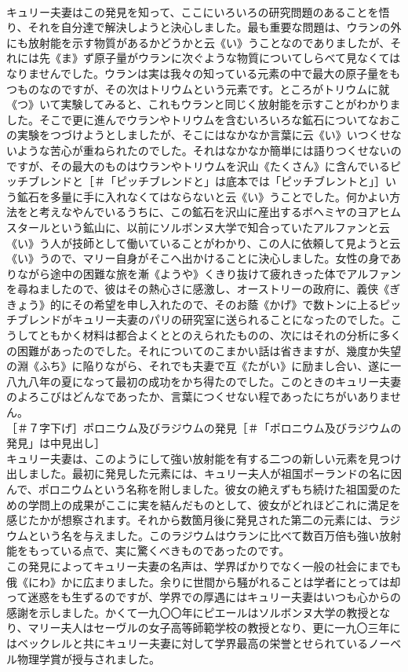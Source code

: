 \documentclass[8pt]{extreport}
\begin{document}
\begin{CJK}{UTF8}{min}
\\	キュリー夫妻はこの発見を知って、ここにいろいろの研究問題のあることを悟り、それを自分達で解決しようと決心しました。最も重要な問題は、ウランの外にも放射能を示す物質があるかどうかと云《い》うことなのでありましたが、それには先《ま》ず原子量がウランに次ぐような物質についてしらべて見なくてはなりませんでした。ウランは実は我々の知っている元素の中で最大の原子量をもつものなのですが、その次はトリウムという元素です。ところがトリウムに就《つ》いて実験してみると、これもウランと同じく放射能を示すことがわかりました。そこで更に進んでウランやトリウムを含むいろいろな鉱石についてなおこの実験をつづけようとしましたが、そこにはなかなか言葉に云《い》いつくせないような苦心が重ねられたのでした。それはなかなか簡単には語りつくせないのですが、その最大のものはウランやトリウムを沢山《たくさん》に含んでいるピッチブレンドと［＃「ピッチブレンドと」は底本では「ピッチブレントと」］いう鉱石を多量に手に入れなくてはならないと云《い》うことでした。何かよい方法をと考えなやんでいるうちに、この鉱石を沢山に産出するボヘミヤのヨアヒムスタールという鉱山に、以前にソルボンヌ大学で知合っていたアルファンと云《い》う人が技師として働いていることがわかり、この人に依頼して見ようと云《い》うので、マリー自身がそこへ出かけることに決心しました。女性の身でありながら途中の困難な旅を漸《ようや》くきり抜けて疲れきった体でアルファンを尋ねましたので、彼はその熱心さに感激し、オーストリーの政府に、義侠《ぎきょう》的にその希望を申し入れたので、そのお蔭《かげ》で数トンに上るピッチブレンドがキュリー夫妻のパリの研究室に送られることになったのでした。こうしてともかく材料は都合よくととのえられたものの、次にはそれの分析に多くの困難があったのでした。それについてのこまかい話は省きますが、幾度か失望の淵《ふち》に陥りながら、それでも夫妻で互《たがい》に励まし合い、遂に一八九八年の夏になって最初の成功をかち得たのでした。このときのキュリー夫妻のよろこびはどんなであったか、言葉につくせない程であったにちがいありません。
\\	［＃７字下げ］ポロニウム及びラジウムの発見［＃「ポロニウム及びラジウムの発見」は中見出し］
\\	キュリー夫妻は、このようにして強い放射能を有する二つの新しい元素を見つけ出しました。最初に発見した元素には、キュリー夫人が祖国ポーランドの名に因んで、ポロニウムという名称を附しました。彼女の絶えずもち続けた祖国愛のための学問上の成果がここに実を結んだものとして、彼女がどれほどこれに満足を感じたかが想察されます。それから数箇月後に発見された第二の元素には、ラジウムという名を与えました。このラジウムはウランに比べて数百万倍も強い放射能をもっている点で、実に驚くべきものであったのです。
\\	この発見によってキュリー夫妻の名声は、学界ばかりでなく一般の社会にまでも俄《にわ》かに広まりました。余りに世間から騒がれることは学者にとっては却って迷惑をも生ずるのですが、学界での厚遇にはキュリー夫妻はいつも心からの感謝を示しました。かくて一九〇〇年にピエールはソルボンヌ大学の教授となり、マリー夫人はセーヴルの女子高等師範学校の教授となり、更に一九〇三年にはベックレルと共にキュリー夫妻に対して学界最高の栄誉とせられているノーベル物理学賞が授与されました。

\end{CJK}
\end{document}
